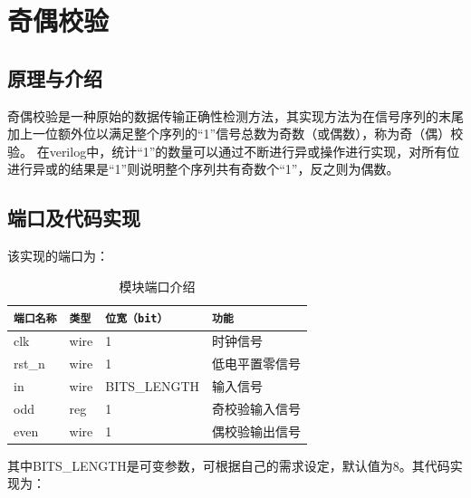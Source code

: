 \documentclass[12pt,hyperref,a4paper,UTF8]{ctexart}
\begin{document}
\cover

%
%

\thispagestyle{empty} %

\newpage
\tableofcontents

\newpage

\section{奇偶校验}

\subsection{原理与介绍}

奇偶校验是一种原始的数据传输正确性检测方法，其实现方法为在信号序列的末尾加上一位额外位以满足整个序列的“1”信号总数为奇数（或偶数），称为奇（偶）校验。
在verilog中，统计“1”的数量可以通过不断进行异或操作进行实现，对所有位进行异或的结果是“1”则说明整个序列共有奇数个“1”，反之则为偶数。

\subsection{端口及代码实现}

该实现的端口为：

\begin{table}[!htbp]
    \centering
    \begin{tabular}{ l | l | l | l }
    \hline
        \texttt{端口名称} & \texttt{类型} & \texttt{位宽（bit）} & \texttt{功能} \\
        \hline
        clk  & wire & 1 & 时钟信号 \\
        rst\_n & wire & 1 & 低电平置零信号 \\
        in & wire & BITS\_LENGTH & 输入信号 \\
        odd & reg & 1 & 奇校验输入信号 \\
        even & wire & 1 & 偶校验输出信号 \\
        \hline
    \end{tabular}
    \caption{模块端口介绍}
    \label{doc}
\end{table}

其中BITS\_LENGTH是可变参数，可根据自己的需求设定，默认值为8。其代码实现为：
\end{document}
